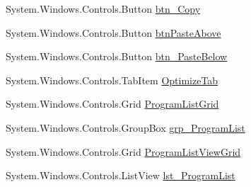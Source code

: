 \begin{DoxyCompactItemize}
\item 
System.\+Windows.\+Controls.\+Button \hyperlink{class_c_p_u___o_s___simulator_1_1_main_window_a55b2516a7b78d0e79deac7f1a79f3a92}{btn\+\_\+\+Copy}
\item 
System.\+Windows.\+Controls.\+Button \hyperlink{class_c_p_u___o_s___simulator_1_1_main_window_ae2ef9b73d0b5776415c7f3e91c1eaf21}{btn\+Paste\+Above}
\item 
System.\+Windows.\+Controls.\+Button \hyperlink{class_c_p_u___o_s___simulator_1_1_main_window_a1c24521ff648d75bf5991567e1a85b55}{btn\+\_\+\+Paste\+Below}
\item 
System.\+Windows.\+Controls.\+Tab\+Item \hyperlink{class_c_p_u___o_s___simulator_1_1_main_window_a47b1359d9e96abf2b0935eb3392405d4}{Optimize\+Tab}
\item 
System.\+Windows.\+Controls.\+Grid \hyperlink{class_c_p_u___o_s___simulator_1_1_main_window_adb8397cdbc794d18b0379ba7251d2278}{Program\+List\+Grid}
\item 
System.\+Windows.\+Controls.\+Group\+Box \hyperlink{class_c_p_u___o_s___simulator_1_1_main_window_a0ccd227c10c9a0878095ef10c0ff92b7}{grp\+\_\+\+Program\+List}
\item 
System.\+Windows.\+Controls.\+Grid \hyperlink{class_c_p_u___o_s___simulator_1_1_main_window_a4e287cef9f0becaebe0777af8de2d8c9}{Program\+List\+View\+Grid}
\item 
System.\+Windows.\+Controls.\+List\+View \hyperlink{class_c_p_u___o_s___simulator_1_1_main_window_ab33f21e0f19eab104e6f67f44d89daeb}{lst\+\_\+\+Program\+List}
\end{DoxyCompactItemize}
